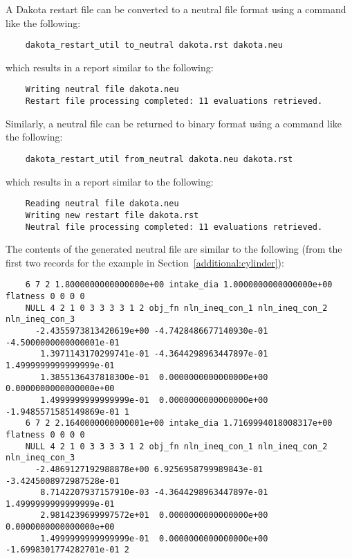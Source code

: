 A Dakota restart file can be converted to a neutral file format using
a command like the following:
\begin{small}
\begin{verbatim}
    dakota_restart_util to_neutral dakota.rst dakota.neu
\end{verbatim}
\end{small}
which results in a report similar to the following:
\begin{small}
\begin{verbatim}
    Writing neutral file dakota.neu
    Restart file processing completed: 11 evaluations retrieved.
\end{verbatim}
\end{small}

Similarly, a neutral file can be returned to binary format using a
command like the following:
\begin{small}
\begin{verbatim}
    dakota_restart_util from_neutral dakota.neu dakota.rst
\end{verbatim}
\end{small}
which results in a report similar to the following:
\begin{small}
\begin{verbatim}
    Reading neutral file dakota.neu
    Writing new restart file dakota.rst
    Neutral file processing completed: 11 evaluations retrieved.
\end{verbatim}
\end{small}

The contents of the generated neutral file are similar to the 
following (from the first two records for the
example in Section~\ref{additional:cylinder}):
\begin{small}
\begin{verbatim}
    6 7 2 1.8000000000000000e+00 intake_dia 1.0000000000000000e+00 flatness 0 0 0 0
    NULL 4 2 1 0 3 3 3 3 1 2 obj_fn nln_ineq_con_1 nln_ineq_con_2 nln_ineq_con_3
      -2.4355973813420619e+00 -4.7428486677140930e-01 -4.5000000000000001e-01
       1.3971143170299741e-01 -4.3644298963447897e-01  1.4999999999999999e-01
       1.3855136437818300e-01  0.0000000000000000e+00  0.0000000000000000e+00
       1.4999999999999999e-01  0.0000000000000000e+00 -1.9485571585149869e-01 1
    6 7 2 2.1640000000000001e+00 intake_dia 1.7169994018008317e+00 flatness 0 0 0 0
    NULL 4 2 1 0 3 3 3 3 1 2 obj_fn nln_ineq_con_1 nln_ineq_con_2 nln_ineq_con_3
      -2.4869127192988878e+00 6.9256958799989843e-01 -3.4245008972987528e-01
       8.7142207937157910e-03 -4.3644298963447897e-01  1.4999999999999999e-01
       2.9814239699997572e+01  0.0000000000000000e+00  0.0000000000000000e+00
       1.4999999999999999e-01  0.0000000000000000e+00 -1.6998301774282701e-01 2
\end{verbatim}
\end{small}

